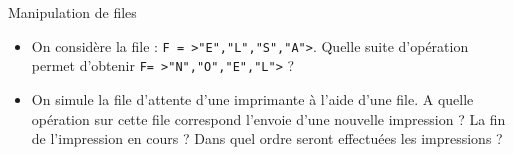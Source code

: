 \documentclass[10pt]{beamer}
\begin{document}
\begin{frame}{\Ctitle}{\stitle}
	\begin{exampleblock}{Manipulation de files}
		\begin{itemize}
			\item<2-> On considère la file : {\tt F = >"E","L","S","A">}. Quelle suite d'opération permet d'obtenir {\tt F= >"N","O","E","L">} ?
			\item<3-> On simule la file d'attente d'une imprimante à l'aide d'une file. A quelle opération sur cette file correspond l'envoie d'une nouvelle impression ? La fin de l'impression en cours ? Dans quel ordre seront effectuées les impressions ?
		\end{itemize}
	\end{exampleblock}
\end{frame}
\end{document}
